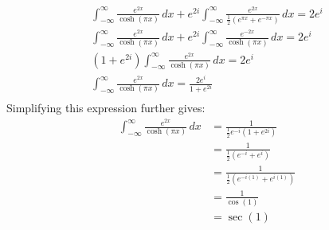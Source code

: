 \documentclass[letterpaper, titlepage, DIV=14]{scrartcl}
\begin{document}
\begin{enumerate}[i)]
\begin{align*}
    \end{align*}
    \begin{gather*}
      \int_{-\infty}^{\infty} \frac{e^{2x}}{\cosh(\pi x)} \, dx + e^{2i}\int_{-\infty}^{\infty} \frac{e^{2x}}{\frac{1}{2}(e^{\pi x}+e^{-\pi x})} \, dx = 2e^{i} \\
      \int_{-\infty}^{\infty} \frac{e^{2x}}{\cosh(\pi x)} \, dx + e^{2i}\int_{-\infty}^{\infty} \frac{e^{-2x}}{\cosh(\pi x)} \, dx = 2e^{i} \\
      (1+e^{2i})\int_{-\infty}^{\infty} \frac{e^{2x}}{\cosh(\pi x)} \, dx = 2e^{i} \\
      \int_{-\infty}^{\infty} \frac{e^{2x}}{\cosh(\pi x)} \, dx = \frac{2e^{i}}{1+e^{2i}} \\
    \end{gather*}
    Simplifying this expression further gives:
    \begin{align*}
      \int_{-\infty}^{\infty} \frac{e^{2x}}{\cosh(\pi x)} \, dx &= \frac{1}{\frac{1}{2}e^{-i}(1+e^{2i})} \\
        &= \frac{1}{\frac{1}{2}(e^{-i}+e^{i})} \\
        &= \frac{1}{\frac{1}{2}(e^{-i(1)}+e^{i(1)})} \\
        &= \frac{1}{\cos(1)} \\
        &= \sec(1)
    \end{align*}
    \end{enumerate}
\end{document}
